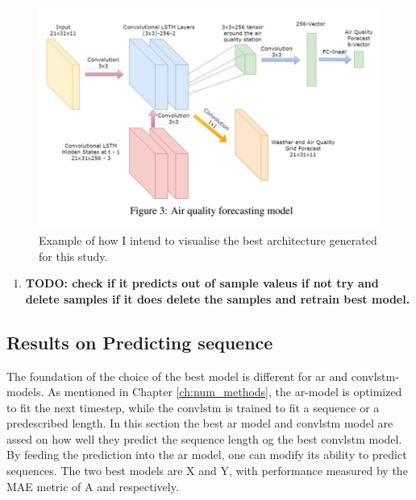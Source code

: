 \begin{figure}
    \centering
    \includegraphics[scale=0.35]{python_figs/example_model.png}
    \caption{Example of how I intend to visualise the best architecture generated for this study.}
    \label{fig:best_ml_architecture}
\end{figure}

\begin{enumerate}
    \item \textbf{TODO: check if it predicts out of sample valeus if not try and delete samples if it does delete the samples and retrain best model.}
\end{enumerate}


\subsection{Results on Predicting sequence}
The foundation of the choice of the best model is different for \acrshort{ar} and \acrshort{convlstm}-models. As mentioned in Chapter \ref{ch:num_methods}, the \acrshort{ar}-model is optimized to fit the next timestep, while the \acrshort{convlstm} is trained to fit a sequence or a predescribed length. In this section the best ar model and convlstm model are assed on how well they predict the sequence length og the best convlstm model. By feeding the prediction into the ar model, one can modify its ability to predict sequences. The two best models are X and Y, with performance measured by the MAE metric of A and respectively. 

